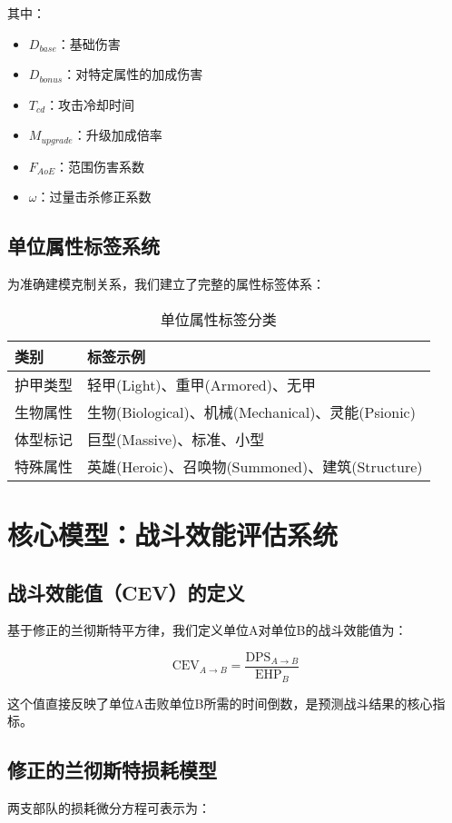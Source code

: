 \documentclass[a4paper,12pt]{article}
\begin{document}
其中：
\begin{itemize}
\item $D_{base}$：基础伤害
\item $D_{bonus}$：对特定属性的加成伤害
\item $T_{cd}$：攻击冷却时间
\item $M_{upgrade}$：升级加成倍率
\item $F_{AoE}$：范围伤害系数
\item $\omega$：过量击杀修正系数
\end{itemize}

\subsection{单位属性标签系统}
为准确建模克制关系，我们建立了完整的属性标签体系：

\begin{table}[h]
\centering
\caption{单位属性标签分类}
\begin{tabular}{ll}
\toprule
\textbf{类别} & \textbf{标签示例} \\
\midrule
护甲类型 & 轻甲(Light)、重甲(Armored)、无甲 \\
生物属性 & 生物(Biological)、机械(Mechanical)、灵能(Psionic) \\
体型标记 & 巨型(Massive)、标准、小型 \\
特殊属性 & 英雄(Heroic)、召唤物(Summoned)、建筑(Structure) \\
\bottomrule
\end{tabular}
\end{table}

\section{核心模型：战斗效能评估系统}

\subsection{战斗效能值（CEV）的定义}
基于修正的兰彻斯特平方律，我们定义单位A对单位B的战斗效能值为：

\begin{equation}
\text{CEV}_{A \rightarrow B} = \frac{\text{DPS}_{A \rightarrow B}}{\text{EHP}_B}
\end{equation}

这个值直接反映了单位A击败单位B所需的时间倒数，是预测战斗结果的核心指标。

\subsection{修正的兰彻斯特损耗模型}
两支部队的损耗微分方程可表示为：
\end{document}
